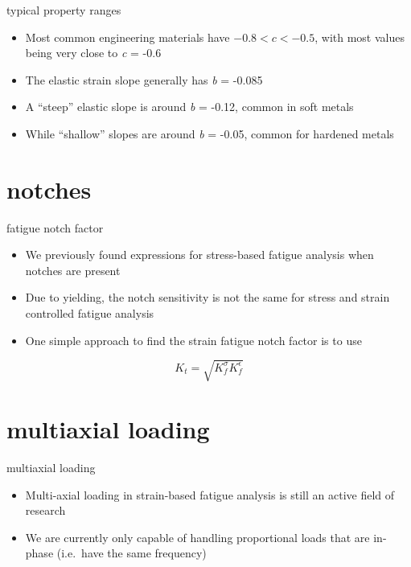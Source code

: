 \documentclass[
  letterpaper,
  ignorenonframetext,
  aspectratio=43,
  handout,
  12pt]{beamer}
\providecommand{\tightlist}{%
  \setlength{\itemsep}{0pt}\setlength{\parskip}{0pt}}
\providecommand{\tightlist}{%
\setlength{\itemsep}{0pt}\setlength{\parskip}{0pt}}
\begin{document}
\begin{frame}{typical property ranges}
\protect\hypertarget{typical-property-ranges}{}
\begin{itemize}
\tightlist
\item
  Most common engineering materials have \(-0.8 < c < -0.5\), with most
  values being very close to \emph{c} = -0.6
\item
  The elastic strain slope generally has \emph{b} = -0.085
\item
  A ``steep'' elastic slope is around \emph{b} = -0.12, common in soft
  metals
\item
  While ``shallow'' slopes are around \emph{b} = -0.05, common for
  hardened metals
\end{itemize}
\end{frame}

\hypertarget{notches}{%
\section{notches}\label{notches}}

\begin{frame}{fatigue notch factor}
\protect\hypertarget{fatigue-notch-factor}{}
\begin{itemize}
\tightlist
\item
  We previously found expressions for stress-based fatigue analysis when
  notches are present
\item
  Due to yielding, the notch sensitivity is not the same for stress and
  strain controlled fatigue analysis
\item
  One simple approach to find the strain fatigue notch factor is to use
\end{itemize}

\[K_t = \sqrt{K_f^\sigma K_f^\epsilon}\]
\end{frame}

\hypertarget{multiaxial-loading}{%
\section{multiaxial loading}\label{multiaxial-loading}}

\begin{frame}{multiaxial loading}
\protect\hypertarget{multiaxial-loading-1}{}
\begin{itemize}
\tightlist
\item
  Multi-axial loading in strain-based fatigue analysis is still an
  active field of research
\item
  We are currently only capable of handling proportional loads that are
  in-phase (i.e.~have the same frequency)
\end{itemize}
\end{frame}
\end{document}
